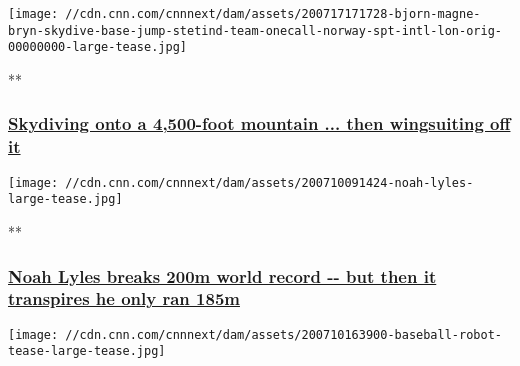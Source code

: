 \href{/videos/sports/2020/07/17/bjorn-magne-bryn-skydive-base-jump-stetind-team-onecall-norway-spt-intl-lon-orig.cnn/video/playlists/international-sport-playlist-general-videos/}{}

\texttt{[image: //cdn.cnn.com/cnnnext/dam/assets/200717171728-bjorn-magne-bryn-skydive-base-jump-stetind-team-onecall-norway-spt-intl-lon-orig-00000000-large-tease.jpg]}

**

\hypertarget{skydiving-onto-a-4500-foot-mountain--then-wingsuiting-off-it}{%
\subsubsection{\texorpdfstring{\href{/videos/sports/2020/07/17/bjorn-magne-bryn-skydive-base-jump-stetind-team-onecall-norway-spt-intl-lon-orig.cnn/video/playlists/international-sport-playlist-general-videos/}{Skydiving
onto a 4,500-foot mountain ... then wingsuiting off
it}}{Skydiving onto a 4,500-foot mountain ... then wingsuiting off it}}\label{skydiving-onto-a-4500-foot-mountain--then-wingsuiting-off-it}}

\href{/videos/sports/2020/07/10/noah-lyles-inspiration-games-200m-zurich-diamond-league-spt-intl-lon-orig.cnn/video/playlists/international-sport-playlist-general-videos/}{}

\texttt{[image: //cdn.cnn.com/cnnnext/dam/assets/200710091424-noah-lyles-large-tease.jpg]}

**

\hypertarget{noah-lyles-breaks-200m-world-record----but-then-it-transpires-he-only-ran-185m}{%
\subsubsection{\texorpdfstring{\href{/videos/sports/2020/07/10/noah-lyles-inspiration-games-200m-zurich-diamond-league-spt-intl-lon-orig.cnn/video/playlists/international-sport-playlist-general-videos/}{Noah
Lyles breaks 200m world record -\/- but then it transpires he only ran
185m}}{Noah Lyles breaks 200m world record -\/- but then it transpires he only ran 185m}}\label{noah-lyles-breaks-200m-world-record----but-then-it-transpires-he-only-ran-185m}}

\href{/videos/sports/2020/07/10/dancing-robots-japan-baseball-coronavirus-lon-orig-naz-spt-intl.cnn/video/playlists/international-sport-playlist-general-videos/}{}

\texttt{[image: //cdn.cnn.com/cnnnext/dam/assets/200710163900-baseball-robot-tease-large-tease.jpg]}

